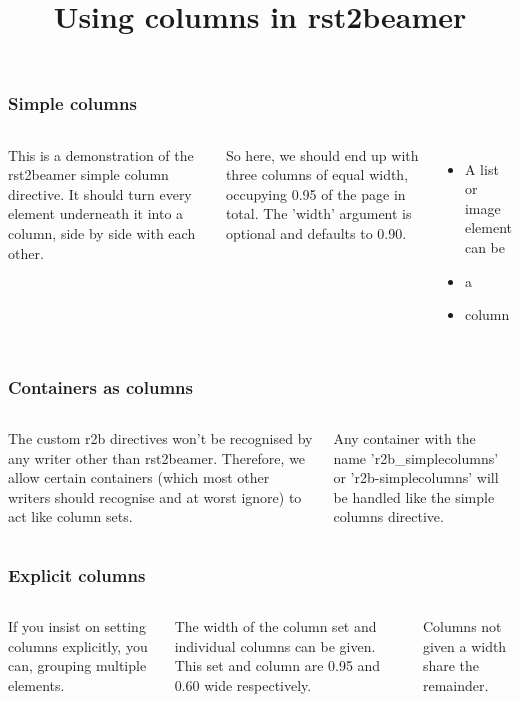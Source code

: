 \documentclass[t,english]{beamer}
\title{Using columns in rst2beamer}
\newlength{\locallinewidth}
\begin{document}
\maketitle

\setlength{\locallinewidth}{\linewidth}

\begin{frame}
\frametitle{Simple columns}

\begin{columns}[T]

This is a demonstration of the rst2beamer simple column directive. It
should turn every element underneath it into a column, side by side with
each other.


So here, we should end up with three columns of equal width, occupying 0.95
of the page in total. The 'width' argument is optional and defaults to
0.90.

\begin{itemize}[<+-| alert@+>]
\item {} 
A list or image element can be

\item {} 
a

\item {} 
column

\end{itemize}

\end{columns}
\end{frame}

\begin{frame}
\frametitle{Containers as columns}

\begin{columns}[T]

The custom r2b directives won't be recognised by any writer other than
rst2beamer. Therefore, we allow certain containers (which most other
writers should recognise and at worst ignore) to act like column sets.


Any container with the name 'r2b{\_}simplecolumns' or 'r2b-simplecolumns' will
be handled like the simple columns directive.

\end{columns}
\end{frame}

\begin{frame}
\frametitle{Explicit columns}

\begin{columns}[T]

If you insist on setting columns explicitly, you can, grouping multiple
elements.

The width of the column set and individual columns can be given. This
set and column are 0.95 and 0.60 wide respectively.


Columns not given a width share the remainder.

\end{columns}
\end{frame}
\end{document}
